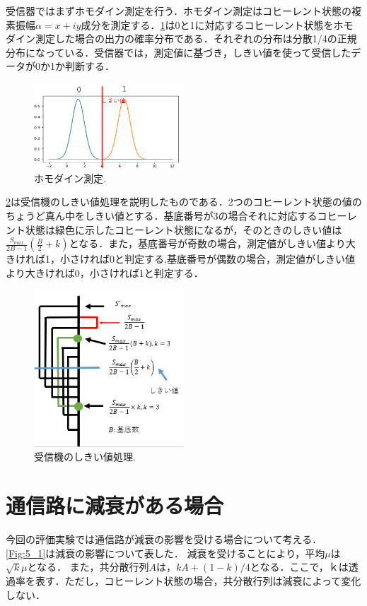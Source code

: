 \documentclass[a4j,twocolumn]{jarticle}
\def \figref #1{\figurename\ref{#1}}
\begin{document}
受信器ではまずホモダイン測定を行う．ホモダイン測定はコヒーレント状態の複素振幅$\alpha=x+iy$成分を測定する．\figref{Fig:4_2}は0と1に対応するコヒーレント状態をホモダイン測定した場合の出力の確率分布である．それぞれの分布は分散1/4の正規分布になっている．受信器では，測定値に基づき，しきい値を使って受信したデータが0か1か判断する．

\begin{figure}[htbp]
        \centering   
        \includegraphics[width=0.5\textwidth]{img/zemi4}
        \caption[sample image (png)]{ホモダイン測定.}
        \label{Fig:4_2}
    \end{figure}
    
\figref{Fig:4_3}は受信機のしきい値処理を説明したものである．2つのコヒーレント状態の値のちょうど真ん中をしきい値とする．基底番号が3の場合それに対応するコヒーレント状態は緑色に示したコヒーレント状態になるが，そのときのしきい値は$\frac{S_{max}}{2B-1}(\frac{B}{2}+k)$となる．また，基底番号が奇数の場合，測定値がしきい値より大きければ1，小さければ0と判定する.基底番号が偶数の場合，測定値がしきい値より大きければ0，小さければ1と判定する．

\begin{figure}[htbp]
        \centering   
        \includegraphics[width=0.5\textwidth]{img/zemi5.png}
        \caption[sample image (png)]{受信機のしきい値処理.}
        \label{Fig:4_3}
    \end{figure}
    
\section{通信路に減衰がある場合}
今回の評価実験では通信路が減衰の影響を受ける場合について考える．
\figref{Fig:5_1}は減衰の影響について表した．
減衰を受けることにより，平均$\mu$は$\sqrt{k}\mu$となる．
また，共分散行列$A$は，$kA+ (1-k)/4　$となる．ここで，$ｋ$は透過率を表す．ただし，コヒーレント状態の場合，共分散行列は減衰によって変化しない．
\end{document}
